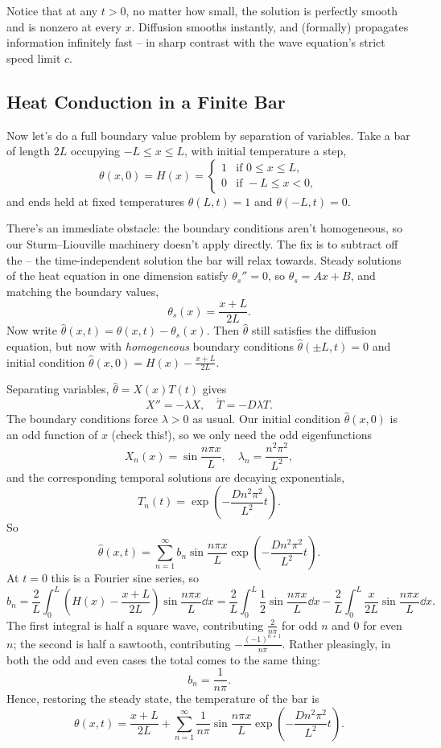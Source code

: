 \documentclass[a4paper]{scrartcl}
\begin{document}
Notice that at any $t > 0$, no matter how small, the solution is perfectly smooth and is nonzero at every $x$. Diffusion smooths instantly, and (formally) propagates information infinitely fast -- in sharp contrast with the wave equation's strict speed limit $c$.

\subsection{Heat Conduction in a Finite Bar}

Now let's do a full boundary value problem by separation of variables. Take a bar of length $2L$ occupying $-L \leq x \leq L$, with initial temperature a step,
$$
\theta(x, 0) = H(x) = \begin{cases}
    1 &\mbox{if } 0 \leq x \leq L, \\
    0 &\mbox{if } -L \leq x < 0,
\end{cases}
$$
and ends held at fixed temperatures $\theta(L, t) = 1$ and $\theta(-L, t) = 0$.

There's an immediate obstacle: the boundary conditions aren't homogeneous, so our Sturm--Liouville machinery doesn't apply directly. The fix is to subtract off the  -- the time-independent solution the bar will relax towards. Steady solutions of the heat equation in one dimension satisfy $\theta_s'' = 0$, so $\theta_s = Ax + B$, and matching the boundary values,
$$
\theta_s(x) = \frac{x + L}{2L}.
$$
Now write $\hat{\theta}(x, t) = \theta(x, t) - \theta_s(x)$. Then $\hat{\theta}$ still satisfies the diffusion equation, but now with \emph{homogeneous} boundary conditions $\hat\theta(\pm L, t) = 0$ and initial condition $\hat\theta(x, 0) = H(x) - \frac{x + L}{2L}$.

Separating variables, $\hat\theta = X(x) T(t)$ gives
$$
X'' = -\lambda X, \quad \dot{T} = -D \lambda T.
$$
The boundary conditions force $\lambda > 0$ as usual. Our initial condition $\hat\theta(x,0)$ is an odd function of $x$ (check this!), so we only need the odd eigenfunctions
$$
X_n(x) = \sin \frac{n \pi x}{L}, \quad \lambda_n = \frac{n^2 \pi^2}{L^2},
$$
and the corresponding temporal solutions are decaying exponentials,
$$
T_n(t) = \exp\left(-\frac{D n^2 \pi^2}{L^2} t\right).
$$
So
$$
\hat\theta(x, t) = \sum_{n = 1}^{\infty} b_n \sin \frac{n \pi x}{L} \exp\left(-\frac{D n^2 \pi^2}{L^2}t\right).
$$
At $t = 0$ this is a Fourier sine series, so
$$
b_n = \frac{2}{L}\int_0^L \left(H(x) - \frac{x + L}{2L}\right)\sin\frac{n \pi x}{L} \dd x
= \frac{2}{L}\int_0^L \frac{1}{2}\sin\frac{n \pi x}{L} \dd x - \frac{2}{L}\int_0^L \frac{x}{2L}\sin\frac{n \pi x}{L} \dd x.
$$
The first integral is half a square wave, contributing $\frac{2}{n \pi}$ for odd $n$ and $0$ for even $n$; the second is half a sawtooth, contributing $-\frac{(-1)^{n+1}}{n \pi}$. Rather pleasingly, in both the odd and even cases the total comes to the same thing:
$$
b_n = \frac{1}{n \pi}.
$$
Hence, restoring the steady state, the temperature of the bar is
$$
\theta(x, t) = \frac{x + L}{2L} + \sum_{n = 1}^{\infty} \frac{1}{n \pi} \sin \frac{n \pi x}{L} \exp\left(-\frac{Dn^2 \pi^2}{L^2} t\right).
$$
\end{document}
